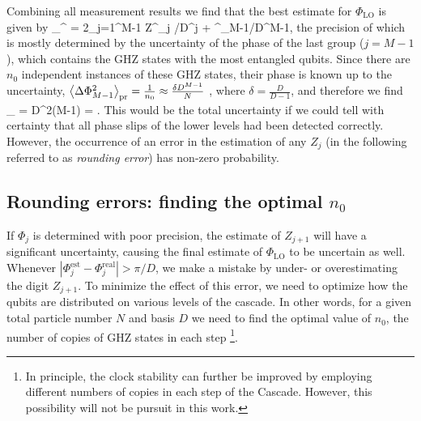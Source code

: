 Combining all measurement results we find that the best estimate for
$\Phi_\mathrm{LO}$ is given by
\bel
\Phi_^ = 2\pi\sum_{j=1}^{M-1} Z^_j /D^{j} +
\Phi^_{M-1}/D^{M-1},
\eel
the precision of which is mostly determined by the uncertainty of the phase of
the last group ($j=M-1$), which contains the GHZ states with the most entangled
qubits. Since there are $n_0$ independent instances of these GHZ states, their
phase is known up to the uncertainty,
$
	\left< \Delta\Phi^2_{M-1} \right>_\mathrm{pr} = \frac{1}{n_0} \approx \frac{\delta
	D^{M-1}}{N }
$
, where $\delta = \frac{D}{D-1}$, and therefore we find
\bel
	\label{eq:projection_GHZ 2}
	_ =
	 {D^{2(M-1)}}  =
	.
\eel
This would be the total uncertainty if we could tell with certainty that all
phase slips of the lower levels had been detected correctly. However, the occurrence of an error in the estimation of any $Z_j$ (in the following referred to as \textit{rounding error}) has non-zero probability. 

\subsection{Rounding errors: finding the optimal $n_0$}
\label{sec:RE}
If $\Phi_j$ is determined
with poor precision, the estimate of $Z_{j+1}$ will have a significant uncertainty,
causing the final estimate of $\Phi_\mathrm{LO}$ to be uncertain as well. Whenever
$|\Phi_j^\mathrm{est} - \Phi_j^\mathrm{real}| > \pi/D$, we make a mistake by under-
or overestimating the digit $Z_{j+1}$. To minimize the effect of
this error, we need to optimize how the qubits are distributed on  various
levels of the cascade. In other words, for a given total particle number $N$ and basis $D$
we need to find the optimal value of $n_0$, the number of copies of GHZ states in each step 
\footnote{In principle, the clock stability can further be improved by employing different numbers of copies in each step of the Cascade. However, this possibility will not be pursuit in this work.}.

